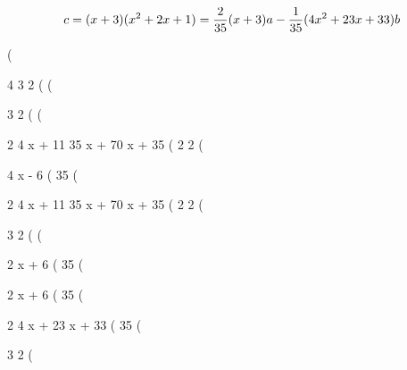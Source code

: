 



$$c = (x+3)(x^2+2x+1)
 = {2\over35}(x+3)a - {1\over35}(4x^2+23x+33)b $$



\begin{computer-maxima}
(%

                           4       3       2
(%
(%

                                 3    2
(%
(%

                                                  2
                                   4 x + 11  35 x  + 70 x + 35
(%
                                      2              2
(%

                                            4 x - 6
(%
                                              35
(%

                                          2
                            4 x + 11  35 x  + 70 x + 35
(%
                               2              2
(%

                               3      2
(%
(%

                                    2 x + 6
(%
                                      35
(%

                                    2 x + 6
(%
                                      35
(%

                                   2
                                4 x  + 23 x + 33
(%
                                       35
(%

                               3      2
(%
\end{computer-maxima}

